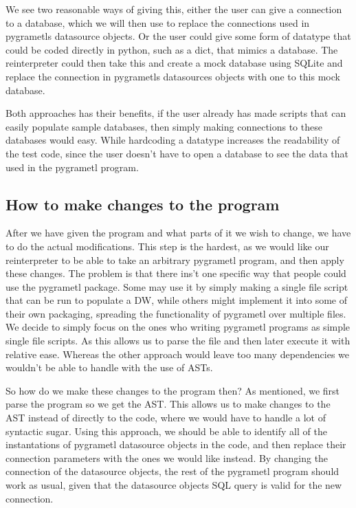 We see two reasonable ways of giving this, either the user can give a connection to a database, which we will then use to replace the connections used in pygrametls datasource objects. Or the user could give some form of datatype that could be coded directly in python, such as a dict, that mimics a database. The reinterpreter could then take this and create a mock database using SQLite and replace the connection in pygrametls datasources objects with one to this mock database.

Both approaches has their benefits, if the user already has made scripts that can easily populate sample databases, then simply making connections to these databases would easy. While hardcoding a datatype increases the readability of the test code, since the user doesn’t have to open a database to see the data that used in the pygrametl program.


\subsection{How to make changes to the program}
After we have given the program and what parts of it we wish to change, we have to do the actual modifications. This step is the hardest, as we would like our reinterpreter to be able to take an arbitrary pygrametl program, and then apply these changes. The problem is that there ins’t one specific way that people could use the pygrametl package. Some may use it by simply making a single file script that can be run to populate a DW, while others might implement it into some of their own packaging, spreading the functionality of pygrametl over multiple files.
We decide to simply focus on the ones who writing pygrametl programs as simple single file scripts. As this allows us to parse the file and then later execute it with relative ease. Whereas the other approach would leave too many dependencies we wouldn’t be able to handle with the use of ASTs.

So how do we make these changes to the program then? As mentioned, we first parse the program so we get the AST. This allows us to make changes to the AST instead of directly to the code, where we would have to handle a lot of syntactic sugar.  Using this approach, we should be able to identify all of the instantations of pygrametl datasource objects in the code, and then replace their connection parameters with the ones we would like instead. By changing the connection of the datasource objects, the rest of the pygrametl program should work as usual, given that the datasource objects SQL query is valid for the new connection.

